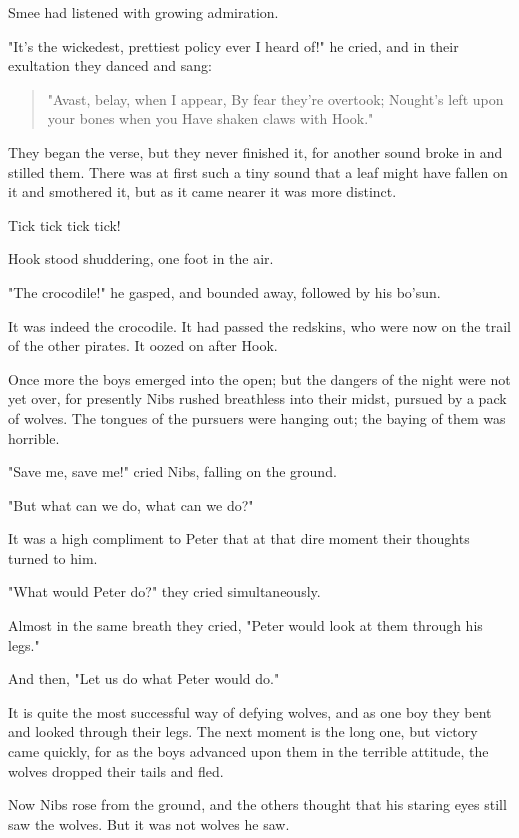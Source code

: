 Smee had listened with growing admiration.


"It's the wickedest, prettiest policy ever I heard of!" he cried, and in
their exultation they danced and sang:

\begin{verse}
     "Avast, belay, when I appear,
     By fear they're overtook;
     Nought's left upon your bones when you
     Have shaken claws with Hook."
\end{verse}

They began the verse, but they never finished it, for another sound broke
in and stilled them. There was at first such a tiny sound that a leaf
might have fallen on it and smothered it, but as it came nearer it was
more distinct.


Tick tick tick tick!


Hook stood shuddering, one foot in the air.


"The crocodile!" he gasped, and bounded away, followed by his bo'sun.


It was indeed the crocodile. It had passed the redskins, who were now on
the trail of the other pirates. It oozed on after Hook.


Once more the boys emerged into the open; but the dangers of the night
were not yet over, for presently Nibs rushed breathless into their midst,
pursued by a pack of wolves. The tongues of the pursuers were hanging out;
the baying of them was horrible.


"Save me, save me!" cried Nibs, falling on the ground.


"But what can we do, what can we do?"


It was a high compliment to Peter that at that dire moment their thoughts
turned to him.


"What would Peter do?" they cried simultaneously.


Almost in the same breath they cried, "Peter would look at them through
his legs."


And then, "Let us do what Peter would do."


It is quite the most successful way of defying wolves, and as one boy they
bent and looked through their legs. The next moment is the long one, but
victory came quickly, for as the boys advanced upon them in the terrible
attitude, the wolves dropped their tails and fled.


Now Nibs rose from the ground, and the others thought that his staring
eyes still saw the wolves. But it was not wolves he saw.


